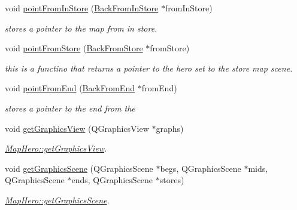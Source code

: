 \begin{DoxyCompactItemize}
void \hyperlink{class_map_hero_ab1afb3bc50f4e64557d93d9e5933de55}{point\-From\-In\-Store} (\hyperlink{class_back_from_in_store}{Back\-From\-In\-Store} $\ast$from\-In\-Store)
\begin{DoxyCompactList}\small\item\em stores a pointer to the map from in store. \end{DoxyCompactList}\item 
void \hyperlink{class_map_hero_a2cc42c31942ce242e9bbcdefe29c6d8b}{point\-From\-Store} (\hyperlink{class_back_from_store}{Back\-From\-Store} $\ast$from\-Store)
\begin{DoxyCompactList}\small\item\em this is a functino that returns a pointer to the hero set to the store map scene. \end{DoxyCompactList}\item 
void \hyperlink{class_map_hero_a6c0c09301c2af7d8513d089f4af1081f}{point\-From\-End} (\hyperlink{class_back_from_end}{Back\-From\-End} $\ast$from\-End)
\begin{DoxyCompactList}\small\item\em stores a pointer to the end from the \end{DoxyCompactList}\item 
void \hyperlink{class_map_hero_a041511fb2146b7362ae6aa61637eba4c}{get\-Graphics\-View} (Q\-Graphics\-View $\ast$graphs)
\begin{DoxyCompactList}\small\item\em \hyperlink{class_map_hero_a041511fb2146b7362ae6aa61637eba4c}{Map\-Hero\-::get\-Graphics\-View}. \end{DoxyCompactList}\item 
void \hyperlink{class_map_hero_a2bee96b4db60849c9313ca7d0f3432c4}{get\-Graphics\-Scene} (Q\-Graphics\-Scene $\ast$begs, Q\-Graphics\-Scene $\ast$mids, Q\-Graphics\-Scene $\ast$ends, Q\-Graphics\-Scene $\ast$stores)
\begin{DoxyCompactList}\small\item\em \hyperlink{class_map_hero_a2bee96b4db60849c9313ca7d0f3432c4}{Map\-Hero\-::get\-Graphics\-Scene}. \end{DoxyCompactList}\end{DoxyCompactItemize}
